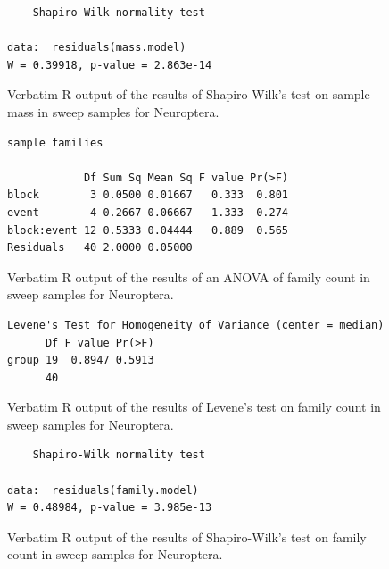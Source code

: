 \documentclass[10pt,letterpaper,twocolumn]{article}
\begin{document}
\begin{figure}[h]
	\lstset{numbers=left}
	\lstset{xleftmargin=5mm,framexleftmargin=5mm}
	\begin{lstlisting}
	Shapiro-Wilk normality test

data:  residuals(mass.model)
W = 0.39918, p-value = 2.863e-14
	\end{lstlisting}
	\caption{Verbatim R output of the results of Shapiro-Wilk's test on sample mass in sweep samples for Neuroptera.}
	\label{fig:sweep_neuroptera_mass_shapiro}
	\smallskip
	\nointerlineskip
	\hrulefill
\end{figure}

\begin{figure}[h]
	\lstset{numbers=left}
	\lstset{xleftmargin=5mm,framexleftmargin=5mm}
	\begin{lstlisting}
sample families 

            Df Sum Sq Mean Sq F value Pr(>F)
block        3 0.0500 0.01667   0.333  0.801
event        4 0.2667 0.06667   1.333  0.274
block:event 12 0.5333 0.04444   0.889  0.565
Residuals   40 2.0000 0.05000               
	\end{lstlisting}
	\caption{Verbatim R output of the results of an ANOVA of family count in sweep samples for Neuroptera.}
	\label{fig:sweep_neuroptera_family_anova}
	\smallskip
	\nointerlineskip
	\hrulefill
\end{figure}

\begin{figure}[h]
	\lstset{numbers=left}
	\lstset{xleftmargin=5mm,framexleftmargin=5mm}
	\begin{lstlisting}
Levene's Test for Homogeneity of Variance (center = median)
      Df F value Pr(>F)
group 19  0.8947 0.5913
      40               
	\end{lstlisting}
	\caption{Verbatim R output of the results of Levene's test on family count in sweep samples for Neuroptera.}
	\label{fig:sweep_neuroptera_family_levene}
	\smallskip
	\nointerlineskip
	\hrulefill
\end{figure}

\begin{figure}[h]
	\lstset{numbers=left}
	\lstset{xleftmargin=5mm,framexleftmargin=5mm}
	\begin{lstlisting}
	Shapiro-Wilk normality test

data:  residuals(family.model)
W = 0.48984, p-value = 3.985e-13
	\end{lstlisting}
	\caption{Verbatim R output of the results of Shapiro-Wilk's test on family count in sweep samples for Neuroptera.}
	\label{fig:sweep_neuroptera_family_shapiro}
	\smallskip
	\nointerlineskip
	\hrulefill
\end{figure}
\end{document}

